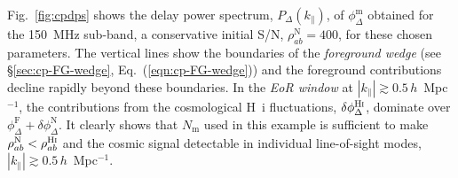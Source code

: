 \documentclass[
reprint,
superscriptaddress,
amsmath,
amssymb,
aps,
prd
]{revtex4-1}
\begin{document}
Fig.~\ref{fig:cpdps} shows the delay power spectrum, $P_\Delta(k_\parallel)$, of $\phi_\Delta^\textrm{m}$ obtained for the 150~MHz sub-band, a conservative initial S/N, $\rho_{ab}^\textrm{N}=400$, for these chosen parameters. The vertical lines show the boundaries of the {\it foreground wedge} (see \S\ref{sec:cp-FG-wedge}, Eq.~(\ref{eqn:cp-FG-wedge})) and the foreground contributions decline rapidly beyond these boundaries. In the {\it EoR window} at $|k_\parallel| \gtrsim 0.5\,h$~Mpc$^{-1}$, the contributions from the cosmological H~{\sc i} fluctuations, $\delta\phi_\Delta^\textrm{H{\sc i}}$, dominate over $\phi_\Delta^\textrm{F} + \delta\phi_\Delta^\textrm{N}$. It clearly shows that $N_\textrm{m}$ used in this example is sufficient to make $\rho_{ab}^\textrm{N} < \rho_{ab}^\textrm{H{\sc i}}$ and the cosmic signal detectable in individual line-of-sight modes, $|k_\parallel| \gtrsim 0.5\,h$~Mpc$^{-1}$. 
\end{document}
